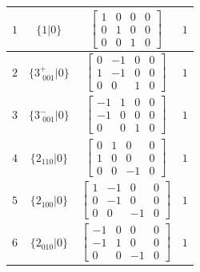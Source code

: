 \documentclass[fleqn,8pt]{jsarticle}
\begin{document}
\begin{longtable}{cccc}
$ 1 $ & $ \{1|0\} $ & $ \begin{bmatrix} 1 & 0 & 0 & 0 \\ 0 & 1 & 0 & 0 \\ 0 & 0 & 1 & 0 \end{bmatrix} $ & $ 1 $ \\ \hline
$ 2 $ & $ \{3^{+}_{\,\,001}|0\} $ & $ \begin{bmatrix} 0 & -1 & 0 & 0 \\ 1 & -1 & 0 & 0 \\ 0 & 0 & 1 & 0 \end{bmatrix} $ & $ 1 $ \\ \hline
$ 3 $ & $ \{3^{-}_{\,\,001}|0\} $ & $ \begin{bmatrix} -1 & 1 & 0 & 0 \\ -1 & 0 & 0 & 0 \\ 0 & 0 & 1 & 0 \end{bmatrix} $ & $ 1 $ \\ \hline
$ 4 $ & $ \{2{}_{110}|0\} $ & $ \begin{bmatrix} 0 & 1 & 0 & 0 \\ 1 & 0 & 0 & 0 \\ 0 & 0 & -1 & 0 \end{bmatrix} $ & $ 1 $ \\ \hline
$ 5 $ & $ \{2{}_{100}|0\} $ & $ \begin{bmatrix} 1 & -1 & 0 & 0 \\ 0 & -1 & 0 & 0 \\ 0 & 0 & -1 & 0 \end{bmatrix} $ & $ 1 $ \\ \hline
$ 6 $ & $ \{2{}_{010}|0\} $ & $ \begin{bmatrix} -1 & 0 & 0 & 0 \\ -1 & 1 & 0 & 0 \\ 0 & 0 & -1 & 0 \end{bmatrix} $ & $ 1 $ \\
\end{longtable}
\end{document}
